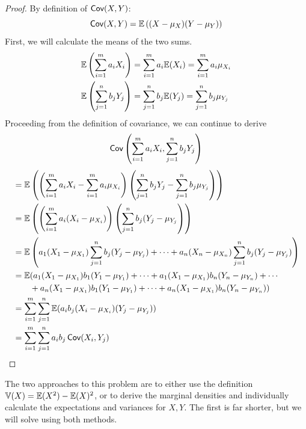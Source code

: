 \documentclass[a4paper]{article}
\begin{document}
\begin{proof}[Proof] 
By definition of \(\operatorname{\textsf{Cov}}(X,Y)\):
\[
	\operatorname{\textsf{Cov}}(X,Y) = \mathbb{E} \left((X - \mu_{X})(Y - \mu_{Y}) \right) 
\]
First, we will calculate the means of the two sums.
\begin{align*}
	\mathbb{E} \left( \sum_{i=1}^{m} a_{i} X_{i} \right)  & = \sum_{i=1}^{m} a_{i} \mathbb{E}(X_{i}) = \sum_{i=1}^{m} a_{i} \mu_{X_{i}} \\
	\mathbb{E} \left( \sum_{j=1}^{n} b_{j} Y_{j} \right)  & = \sum_{j=1}^{n} b_{j} \mathbb{E}(Y_{j}) = \sum_{j=1}^{n} b_{j} \mu_{Y_{j}} \\ 
\end{align*}
Proceeding from the definition of covariance, we can continue to derive
\[
	\operatorname{\textsf{Cov}} \left( \sum_{i=1}^{m} a_{i} X_{i}, \sum_{j=1}^{n} b_{j} Y_{j} \right) 
\]
\begin{align*}
	 & = \mathbb{E} \left( \left( \sum_{i=1}^{m} a_{i}X_{i} - \sum_{i=1}^{m} a_{i}\mu_{X_{i}} \right) \left( \sum_{j=1}^{n} b_{j}Y_{j} - \sum_{j=1}^{n} b_{j} \mu_{Y_{j}} \right)  \right)  \\
	 & = \mathbb{E} \left( \left( \sum_{i=1}^{m} a_{i} (X_{i} - \mu_{X_{i}}) \right) \left( \sum_{j=1}^{n} b_{j}(Y_{j} - \mu_{Y_{j}} \right)  \right)  \\ 
	 & = \mathbb{E} \left( a_{1}(X_{1} - \mu_{X_{1}}) \sum_{j=1}^{n} b_{j}(Y_{j} - \mu_{Y_{j}}) + \cdots + a_{n}(X_{n} - \mu_{X_{n}}) \sum_{j=1}^{n} b_{j} (Y_{j}-\mu_{Y_{j}}) \right) \\
	 & = \mathbb{E}(a_{1}(X_{1} - \mu_{X_{1}})b_{1}(Y_{1} - \mu_{Y_{1}}) + \cdots + a_{1}(X_{1} - \mu_{X_{1}}) b_{n}(Y_{n} - \mu_{Y_{n}}) + \cdots\\
	 & \qquad + a_{n}(X_{1} - \mu_{X_{1}}) b_{1}(Y_{1} - \mu_{Y_{1}}) + \cdots + a_{n} (X_{1} - \mu_{X_{1}}) b_{n}(Y_{n} - \mu_{Y_{n}})) \\
	 & = \sum_{i=1}^{m} \sum_{j=1}^{n} \mathbb{E}(a_{i}b_{j}(X_{i} - \mu_{X_{i}})(Y_{j} - \mu_{Y_{j}})) \\
	 & = \sum_{i=1}^{m} \sum_{j=1}^{n} a_{i}b_{j} \operatorname{\textsf{Cov}}(X_{i},Y_{j})
\end{align*}
\end{proof}

The two approaches to this problem are to either use the definition \(\mathbb{V}(X) = \mathbb{E}(X^{2}) - \mathbb{E}(X)^{2}\), or to derive the marginal densities and individually calculate the expectations and variances for \(X,Y\). The first is far shorter, but we will solve using both methods.
\end{document}
